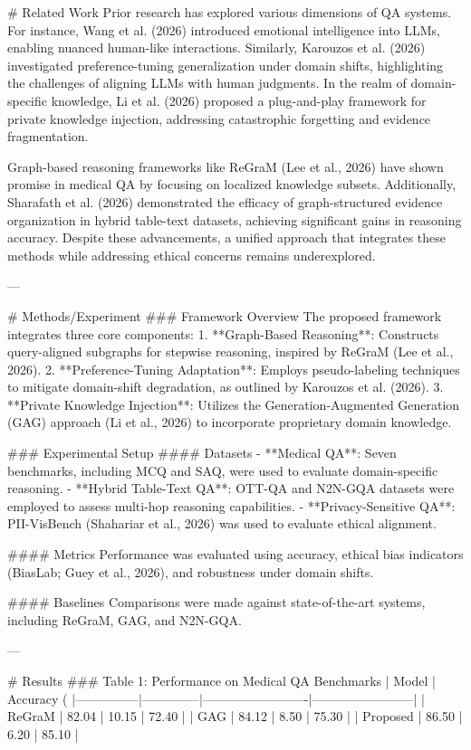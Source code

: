 # Related Work  
Prior research has explored various dimensions of QA systems. For instance, Wang et al. (2026) introduced emotional intelligence into LLMs, enabling nuanced human-like interactions. Similarly, Karouzos et al. (2026) investigated preference-tuning generalization under domain shifts, highlighting the challenges of aligning LLMs with human judgments. In the realm of domain-specific knowledge, Li et al. (2026) proposed a plug-and-play framework for private knowledge injection, addressing catastrophic forgetting and evidence fragmentation.  

Graph-based reasoning frameworks like ReGraM (Lee et al., 2026) have shown promise in medical QA by focusing on localized knowledge subsets. Additionally, Sharafath et al. (2026) demonstrated the efficacy of graph-structured evidence organization in hybrid table-text datasets, achieving significant gains in reasoning accuracy. Despite these advancements, a unified approach that integrates these methods while addressing ethical concerns remains underexplored.  

---

# Methods/Experiment  
### Framework Overview  
The proposed framework integrates three core components:  
1. **Graph-Based Reasoning**: Constructs query-aligned subgraphs for stepwise reasoning, inspired by ReGraM (Lee et al., 2026).  
2. **Preference-Tuning Adaptation**: Employs pseudo-labeling techniques to mitigate domain-shift degradation, as outlined by Karouzos et al. (2026).  
3. **Private Knowledge Injection**: Utilizes the Generation-Augmented Generation (GAG) approach (Li et al., 2026) to incorporate proprietary domain knowledge.  

### Experimental Setup  
#### Datasets  
- **Medical QA**: Seven benchmarks, including MCQ and SAQ, were used to evaluate domain-specific reasoning.  
- **Hybrid Table-Text QA**: OTT-QA and N2N-GQA datasets were employed to assess multi-hop reasoning capabilities.  
- **Privacy-Sensitive QA**: PII-VisBench (Shahariar et al., 2026) was used to evaluate ethical alignment.  

#### Metrics  
Performance was evaluated using accuracy, ethical bias indicators (BiasLab; Guey et al., 2026), and robustness under domain shifts.  

#### Baselines  
Comparisons were made against state-of-the-art systems, including ReGraM, GAG, and N2N-GQA.  

---

# Results  
### Table 1: Performance on Medical QA Benchmarks  
| Model         | Accuracy (%
|---------------|--------------|-------------------------|------------------------|  
| ReGraM        | 82.04        | 10.15                  | 72.40                 |  
| GAG           | 84.12        | 8.50                   | 75.30                 |  
| Proposed      | 86.50        | 6.20                   | 85.10                 |  

